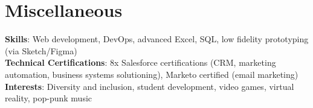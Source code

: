 \documentclass[letterpaper,12pt]{article}
\begin{document}
%
\section{Miscellaneous}
 \begin{itemize}[leftmargin=0.15in, label={}]
    \small{\item{
     \textbf{Skills}{: Web development, DevOps, advanced Excel, SQL, low fidelity prototyping (via Sketch/Figma)} \\
     \textbf{Technical Certifications}{: 8x Salesforce certifications (CRM, marketing automation, business systems solutioning), Marketo certified (email marketing)} \\
     \textbf{Interests}{: Diversity and inclusion, student development, video games, virtual reality, pop-punk music} \\
    }}
 \end{itemize}


\end{document}
